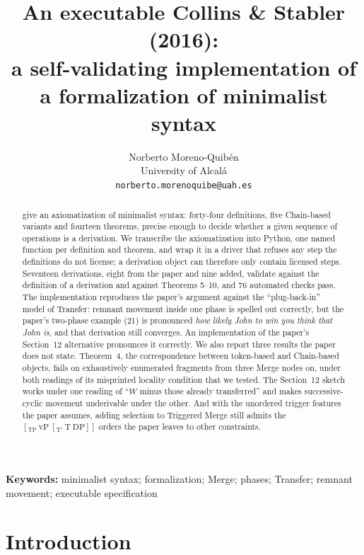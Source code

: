 \documentclass[11pt]{article}
\title{An executable Collins \& Stabler (2016):\\[2pt]
\large a self-validating implementation of a formalization of minimalist syntax}
\author{Norberto Moreno-Quibén\\
  University of Alcalá\\
  \texttt{norberto.morenoquibe@uah.es}}
\date{}
\newcommand{\pf}[1]{\textit{#1}}
\theoremstyle{definition}
\theoremstyle{plain}
\begin{document}
\maketitle

\begin{abstract}
\citet{CollinsStabler2016} give an axiomatization of minimalist syntax:
forty-four definitions, five Chain-based variants and fourteen theorems,
precise enough to decide whether a given sequence of operations is a
derivation. We transcribe the axiomatization into Python,
one named function per definition and theorem, and wrap it in a driver that
refuses any step the definitions do not license; a derivation object can
therefore only contain licensed steps. Seventeen derivations, eight from
the paper and nine added, validate against the definition of a derivation
and against Theorems 5--10, and 76 automated checks pass. The implementation
reproduces the paper's argument against the ``plug-back-in'' model of
Transfer: remnant movement inside one phase is spelled out correctly, but the
paper's two-phase example (21) is pronounced \pf{how likely John to win you
think that John is}, and that derivation still converges. An implementation
of the paper's Section~12 alternative pronounces it correctly. We also report
three results the paper does not state. Theorem~4, the correspondence between
token-based and Chain-based objects, fails on exhaustively enumerated
fragments from three Merge nodes on, under both readings of its misprinted
locality condition that we tested. The Section~12 sketch works under one reading of ``$W$
minus those already transferred'' and makes successive-cyclic movement
underivable under the other. And with the unordered trigger features the
paper assumes, adding selection to Triggered Merge still admits the
$[_{\mathrm{TP}}\ \mathrm{vP}\ [_{\mathrm{T'}}\ \mathrm{T}\ \mathrm{DP}]]$
orders the paper leaves to other constraints.
\end{abstract}

\medskip
\noindent\textbf{Keywords:} minimalist syntax; formalization; Merge;
phases; Transfer; remnant movement; executable specification

\section{Introduction}
\label{sec:intro}
\end{document}
